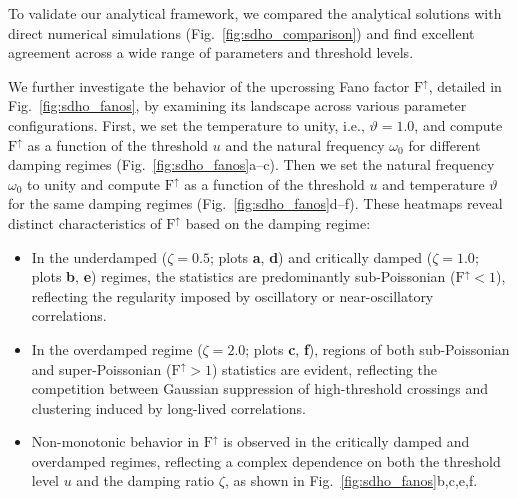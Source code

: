 \documentclass[journal]{IEEEtran}
\theoremstyle{plain}
\theoremstyle{definition}
\theoremstyle{remark}
\newcommand{\FFup}{\mathrm{F}^\uparrow}
\newcommand{\temp}{\vartheta}
\begin{document}
To validate our analytical framework, we compared the analytical solutions with direct numerical simulations (Fig.~\ref{fig:sdho_comparison}) and find excellent agreement across a wide range of parameters and threshold levels.






We further investigate the behavior of the upcrossing Fano factor $\FFup$, detailed in Fig.~\ref{fig:sdho_fanos}, by examining its landscape across various parameter configurations. First, we set the temperature to unity, i.e., $\temp=1.0$, and compute $\FFup$ as a function of the threshold $u$ and the natural frequency $\omega_0$ for different damping regimes (Fig.~\ref{fig:sdho_fanos}a--c). Then we set the natural frequency $\omega_0$ to unity and compute $\FFup$ as a function of the threshold $u$ and temperature $\temp$ for the same damping regimes (Fig.~\ref{fig:sdho_fanos}d--f). These heatmaps reveal distinct characteristics of $\FFup$ based on the damping regime:
\begin{itemize}
    \item In the underdamped ($\zeta=0.5$; plots \textbf{a}, \textbf{d}) and critically damped ($\zeta=1.0$; plots \textbf{b}, \textbf{e}) regimes, the statistics are predominantly sub-Poissonian ($\FFup < 1$), reflecting the regularity imposed by oscillatory or near-oscillatory correlations.
    \item In the overdamped regime ($\zeta=2.0$; plots \textbf{c}, \textbf{f}), regions of both sub-Poissonian and super-Poissonian ($\FFup > 1$) statistics are evident, reflecting the competition between Gaussian suppression of high-threshold crossings and clustering induced by long-lived correlations.
    \item Non-monotonic behavior in $\FFup$ is observed 
    in the critically damped and overdamped regimes, 
    reflecting a complex dependence on both the threshold 
    level $u$ and the damping ratio $\zeta$, as shown in 
    Fig.~\ref{fig:sdho_fanos}b,c,e,f.   
\end{itemize}
\end{document}
